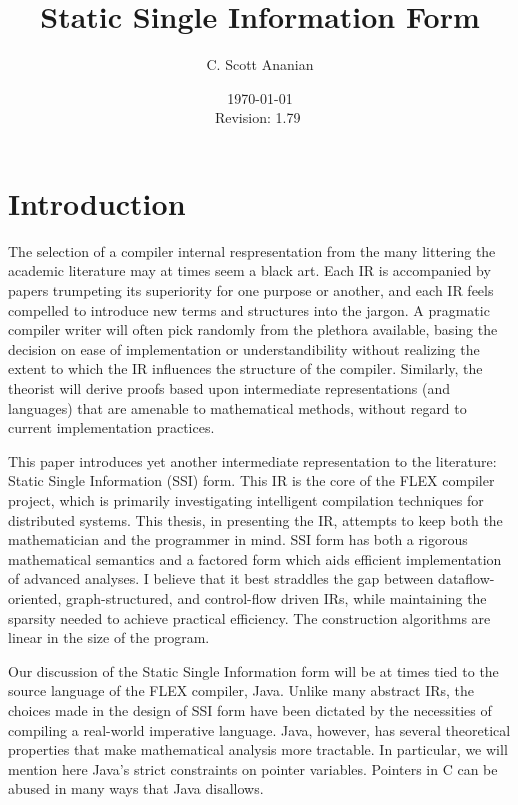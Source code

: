 \documentclass[12pt,titlepage,twoside]{article}
\title{Static Single Information Form
}
\author{C. Scott Ananian}
\date{\today \\ $ $Revision: 1.79 $ $}
\let\oldsection\section
\renewcommand{\section}{\setcounter{figure}{0}\setcounter{table}{0}\oldsection}
\begin{document}


\pagestyle{empty}
\maketitle\cleardoublepage
\pagestyle{myheadings}
\tableofcontents\listoffigures\listoftables\listofalgorithms\cleardoublepage
{}

\section{Introduction}
The selection of a compiler internal respresentation from the many
littering the academic literature may at times seem a black art.  Each
IR is accompanied by papers trumpeting its superiority for one purpose
or another, and each IR feels compelled to introduce new terms and
structures into the jargon.  A pragmatic compiler writer will often
pick randomly from the plethora available, basing the decision on ease
of implementation or understandibility without realizing the extent to
which the IR influences the structure of the compiler.  Similarly, the
theorist will derive proofs based upon intermediate representations
(and languages) that are amenable to mathematical methods, without
regard to current implementation practices.%

This paper introduces yet another intermediate
representation to the literature:  Static Single Information (SSI) form.
This IR is the core of the FLEX compiler project, which is primarily
investigating intelligent compilation techniques for distributed
systems.  This thesis, in presenting the IR,
attempts to keep both the mathematician and the programmer in mind.  
SSI form has both a rigorous mathematical semantics and a factored
form which aids efficient implementation of advanced analyses.
I believe that it best straddles the gap between dataflow-oriented,
graph-structured, and control-flow driven IRs, while maintaining the
sparsity needed to achieve practical efficiency.  The construction
algorithms are linear in the size of the program.

Our discussion of the Static Single Information form will be at times
tied to the source language of the FLEX compiler, Java.  Unlike many
abstract IRs, the choices made in the design of SSI form have been
dictated by the necessities of compiling a real-world imperative
language.  Java, however, has several theoretical properties that make
mathematical analysis more tractable.  In particular, we
will mention here Java's strict constraints on pointer variables.
Pointers in C can be abused in many ways that Java disallows.
\end{document}
